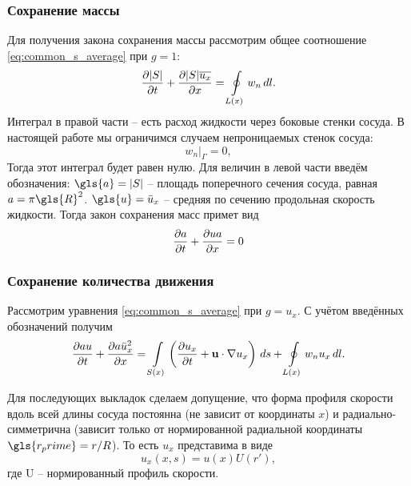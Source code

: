 \subsubsection{Сохранение массы}
Для получения закона сохранения массы рассмотрим общее
соотношение \cref{eq:common_s_average} при $g = 1$:
\begin{equation}
\nonumber
\frac{\partial |S|}{\partial t} + \frac{\partial |S| \overline{u_x} }{\partial x} =
\oint\limits_{L(x)} w_n \, dl.
\end{equation}
Интеграл в правой части -- есть расход жидкости через 
боковые стенки сосуда. В настоящей работе мы ограничимся
случаем непроницаемых стенок сосуда:
\begin{equation}
\nonumber
\left.w_n \right|_\Gamma = 0,
\end{equation}
Тогда этот интеграл будет равен нулю.
Для величин в левой части введём обозначения:
$\gls{a} = |S|$ -- площадь поперечного сечения сосуда, равная $a = \pi \gls{R}^2$.
$\gls{u} = \bar u_x$ -- средняя по сечению продольная скорость жидкости.
Тогда закон сохранения масс примет вид
\begin{equation}
\label{eq:mass_conservation}
\frac{\partial a}{\partial t} + \frac{\partial u a}{\partial x} =0
\end{equation}

\subsubsection{Сохранение количества движения}
Рассмотрим уравнения \cref{eq:common_s_average}
при $g = u_x$. С учётом введённых обозначений получим
\begin{equation}
\label{eq:momentum_first}
\frac{\partial a u}{\partial t} + \frac{\partial a \bar u_x^2 }{\partial x} =
\int\limits_{S(x)} \left(\frac{\partial u_x}{\partial t} + \boldsymbol{\rm u} \cdot \nabla u_x \right)\, ds
+ \oint\limits_{L(x)} w_n u_x \, dl.
\end{equation}

Для последующих выкладок сделаем допущение, что форма профиля скорости вдоль всей длины сосуда постоянна (не зависит от координаты $x$)
и радиально-симметрична (зависит только от нормированной радиальной координаты $\gls{r_prime} = r/R$).
То есть $u_x$ представима в виде
\begin{equation}
\label{eq:ux_simplification}
u_x(x, s) = u(x) U(r'),
\end{equation}
где \gls{U} -- нормированный профиль скорости.


